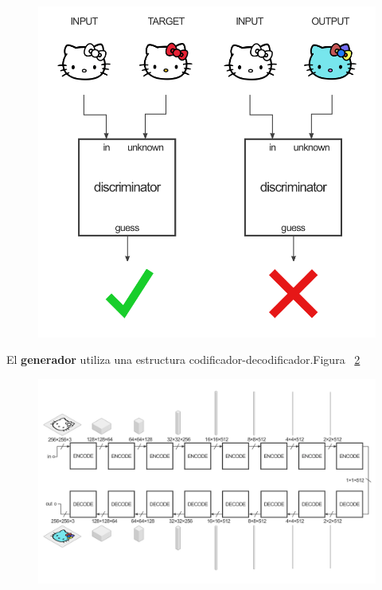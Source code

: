 \documentclass[10pt,journal,compsoc]{IEEEtran}\usepackage[T1]{fontenc}                              %
\begin{document}
\begin{figure}[!htb]
  \begin{center}
    \includegraphics[width=\linewidth]{./imgs/04_pix2pix_example.png}
    \caption{}
    \label{fig:3}
  \end{center}
\end{figure}

El \textbf{generador} utiliza una estructura codificador-decodificador.Figura ~\ref{fig:4}

\begin{figure}[!htb]
  \begin{center}
    \includegraphics[width=\linewidth]{./imgs/05_pix2pix_example.png}
    \caption{}
    \label{fig:4}
  \end{center}
\end{figure}
\end{document}
